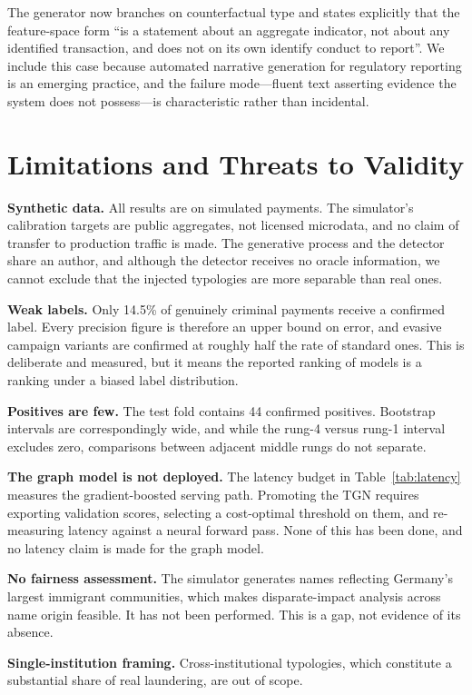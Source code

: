 \documentclass[conference]{IEEEtran}
\begin{document}
The generator now branches on counterfactual type and states explicitly that the
feature-space form ``is a statement about an aggregate indicator, not about any
identified transaction, and does not on its own identify conduct to report''. We
include this case because automated narrative generation for regulatory
reporting is an emerging practice, and the failure mode---fluent text asserting
evidence the system does not possess---is characteristic rather than incidental.

\section{Limitations and Threats to Validity}

\textbf{Synthetic data.} All results are on simulated payments. The simulator's
calibration targets are public aggregates, not licensed microdata, and no claim
of transfer to production traffic is made. The generative process and the
detector share an author, and although the detector receives no oracle
information, we cannot exclude that the injected typologies are more separable
than real ones.

\textbf{Weak labels.} Only 14.5\% of genuinely criminal payments receive a
confirmed label. Every precision figure is therefore an upper bound on error,
and evasive campaign variants are confirmed at roughly half the rate of standard
ones. This is deliberate and measured, but it means the reported ranking of
models is a ranking under a biased label distribution.

\textbf{Positives are few.} The test fold contains 44 confirmed positives.
Bootstrap intervals are correspondingly wide, and while the rung-4 versus rung-1
interval excludes zero, comparisons between adjacent middle rungs do not
separate.

\textbf{The graph model is not deployed.} The latency budget in
Table~\ref{tab:latency} measures the gradient-boosted serving path. Promoting the
TGN requires exporting validation scores, selecting a cost-optimal threshold on
them, and re-measuring latency against a neural forward pass. None of this has
been done, and no latency claim is made for the graph model.

\textbf{No fairness assessment.} The simulator generates names reflecting
Germany's largest immigrant communities, which makes disparate-impact analysis
across name origin feasible. It has not been performed. This is a gap, not
evidence of its absence.

\textbf{Single-institution framing.} Cross-institutional typologies, which
constitute a substantial share of real laundering, are out of scope.
\end{document}
